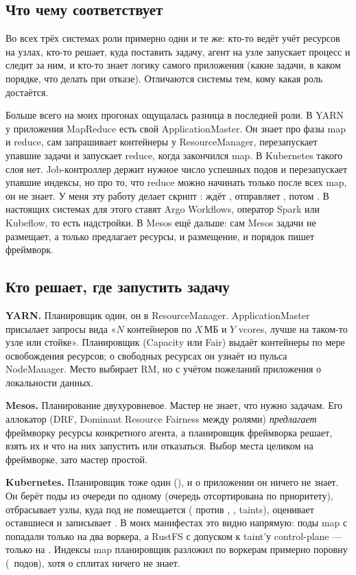 \subsection{Что чему соответствует}

Во всех трёх системах роли примерно одни и те же: кто-то ведёт учёт ресурсов на узлах, кто-то решает, куда поставить задачу, агент на узле запускает процесс и следит за ним, и кто-то знает логику самого приложения (какие задачи, в каком порядке, что делать при отказе). Отличаются системы тем, кому какая роль достаётся.


Больше всего на моих прогонах ощущалась разница в последней роли. В YARN у приложения MapReduce есть свой ApplicationMaster. Он знает про фазы map и reduce, сам запрашивает контейнеры у ResourceManager, перезапускает упавшие задачи и запускает reduce, когда закончился map. В Kubernetes такого слоя нет. Job-контроллер держит нужное число успешных подов и перезапускает упавшие индексы, но про то, что reduce можно начинать только после всех map, он не знает. У меня эту работу делает скрипт : ждёт , отправляет , потом . В настоящих системах для этого ставят Argo Workflows, оператор Spark или Kubeflow, то есть надстройки. В Mesos ещё дальше: сам Mesos задачи не размещает, а только предлагает ресурсы, и размещение, и порядок пишет фреймворк.

\subsection{Кто решает, где запустить задачу}

\textbf{YARN.} Планировщик один, он в ResourceManager. ApplicationMaster присылает запросы вида «$N$ контейнеров по $X$\,МБ и $Y$ vcores, лучше на таком-то узле или стойке». Планировщик (Capacity или Fair) выдаёт контейнеры по мере освобождения ресурсов; о свободных ресурсах он узнаёт из пульса NodeManager. Место выбирает RM, но с учётом пожеланий приложения о локальности данных.

\textbf{Mesos.} Планирование двухуровневое. Мастер не знает, что нужно задачам. Его аллокатор (DRF, Dominant Resource Fairness между ролями) \emph{предлагает} фреймворку ресурсы конкретного агента, а планировщик фреймворка решает, взять их и что на них запустить или отказаться. Выбор места целиком на фреймворке, зато мастер простой.

\textbf{Kubernetes.} Планировщик тоже один (), и о приложении он ничего не знает. Он берёт поды из очереди по одному (очередь отсортирована по приоритету), отбрасывает узлы, куда под не помещается ( против , , taints), оценивает оставшиеся и записывает . В моих манифестах это видно напрямую: поды map с  попадали только на два воркера, а RustFS с допуском к taint'у control-plane --- только на . Индексы map планировщик разложил по воркерам примерно поровну (\parNodeSplit\ подов), хотя о сплитах ничего не знает.


